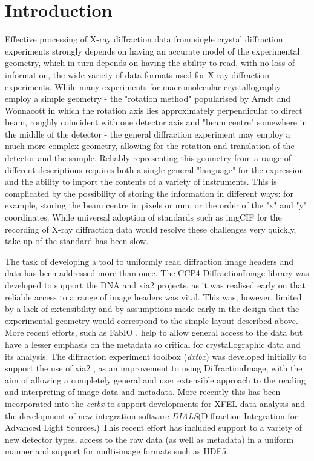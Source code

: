 \documentclass[preprint]{iucr}
\newcommand{\cctbx}{\emph{cctbx}\xspace}
\newcommand{\dxtbx}{\emph{dxtbx}\xspace}
\newcommand{\dials}{\emph{DIALS}\xspace}
\begin{document}
\section{Introduction}

Effective processing of X-ray diffraction data from single crystal diffraction
experiments strongly depends on having an accurate model of the experimental
geometry, which in turn depends on having the ability to read, with no loss of
information, the wide variety of data formats used for X-ray diffraction
experiments. While many experiments for macromolecular crystallography employ a
simple geometry - the "rotation method" popularised by Arndt and Wonnacott
\cite{Arndt1977} in which the rotation axis lies approximately
perpendicular to direct beam, roughly coincident with one detector axis and 
"beam centre" somewhere in the middle of the detector \cite{Rossmann1979} - the 
general diffraction experiment may employ a much more complex geometry, allowing
for the rotation and translation of the detector and the sample. Reliably
representing this geometry from a range of different descriptions requires both
a single general "language" for the expression and the ability to import the 
contents of a variety of instruments. This is complicated by the possibility of 
storing the information in different ways: for example, storing the beam centre 
in pixels or mm, or the order of the "x" and "y" coordinates. While universal 
adoption of standards such as imgCIF \cite{Bernstein2005} for the 
recording of X-ray diffraction data would resolve these challenges very quickly, 
take up of the standard has been slow. 

The task of developing a tool to uniformly read diffraction image headers and
data has been addressed more than once. The CCP4 DiffractionImage library
\cite{Remacle2007} was developed to support the DNA and xia2 projects, as
it was realised early on that reliable access to a range of image headers was
vital. This was, however, limited by a lack of extensibility and by assumptions
made early in the design that the experimental geometry would correspond to the
simple layout described above. More recent efforts, such as FabIO 
\cite{Knudsen2013}, help to allow general access to the data but have a lesser 
emphasis on the metadata so critical for crystallographic data and its analysis. 
The diffraction experiment toolbox (\dxtbx) was developed initially to support 
the use of xia2 \cite{Winter2009}, as an improvement to using DiffractionImage, 
with the aim of allowing a completely general and user extensible approach to 
the reading and interpreting of image data and metadata. More recently this has 
been incorporated into the \cctbx \cite{Grosse-Kunstleve2002} to support
developments for XFEL data analysis \cite{Sauter2013} and the development of
new integration software \dials (Diffraction Integration for Advanced Light
Sources.) This recent effort has included support to a variety of new detector
types, access to the raw data (as well as metadata) in a uniform manner and
support for multi-image formats such as HDF5.
\end{document}

